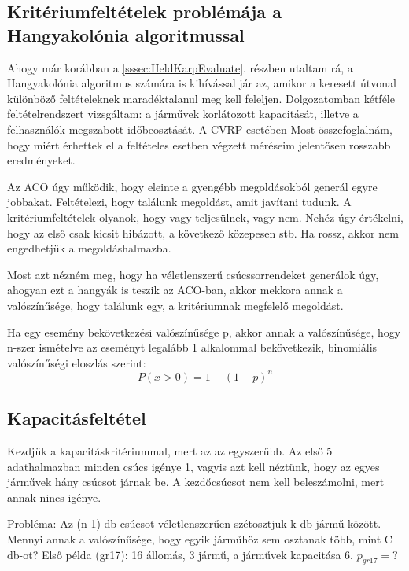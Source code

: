 \subsection{Kritériumfeltételek problémája a Hangyakolónia algoritmussal}
\label{subsection:conditionsWithACO}
Ahogy már korábban a \ref{sssec:HeldKarpEvaluate}. részben utaltam rá, a Hangyakolónia algoritmus számára is kihívással jár az, amikor a keresett útvonal különböző feltételeknek maradéktalanul meg kell feleljen. Dolgozatomban kétféle feltételrendszert vizsgáltam: a járművek korlátozott kapacitását, illetve a felhasználók megszabott időbeosztását. A CVRP esetében Most összefoglalnám, hogy miért érhettek el a feltételes esetben végzett méréseim jelentősen rosszabb eredményeket.

Az ACO úgy működik, hogy eleinte a gyengébb megoldásokból generál egyre jobbakat. Feltételezi, hogy találunk megoldást, amit javítani tudunk. A kritériumfeltételek olyanok, hogy vagy teljesülnek, vagy nem. Nehéz úgy értékelni, hogy az első csak kicsit hibázott, a következő közepesen stb. Ha rossz, akkor nem engedhetjük a megoldáshalmazba.

Most azt nézném meg, hogy ha véletlenszerű csúcssorrendeket generálok úgy, ahogyan ezt a hangyák is teszik az ACO-ban, akkor mekkora annak a valószínűsége, hogy találunk egy, a kritériumnak megfelelő megoldást.

Ha egy esemény bekövetkezési valószínűsége p, akkor annak a valószínűsége, hogy n-szer ismételve az eseményt legalább 1 alkalommal bekövetkezik, binomiális valószínűségi eloszlás szerint:
\begin{equation}
	P(x>0) = 1-(1-p)^n
	\label{binomial_probability}
\end{equation}

\subsection{Kapacitásfeltétel}
Kezdjük a kapacitáskritériummal, mert az az egyszerűbb. Az első 5 adathalmazban minden csúcs igénye 1, vagyis azt kell néztünk, hogy az egyes járművek hány csúcsot járnak be. A kezdőcsúcsot nem kell beleszámolni, mert annak nincs igénye. 

Probléma: Az (n-1) db csúcsot véletlenszerűen szétosztjuk k db jármű között. Mennyi annak a valószínűsége, hogy egyik járműhöz sem osztanak több, mint C db-ot? Első példa (gr17): 16 állomás, 3 jármű, a járművek kapacitása 6. \(p_{gr17}=?\)

\newcommand{\pgr}{0,258}


